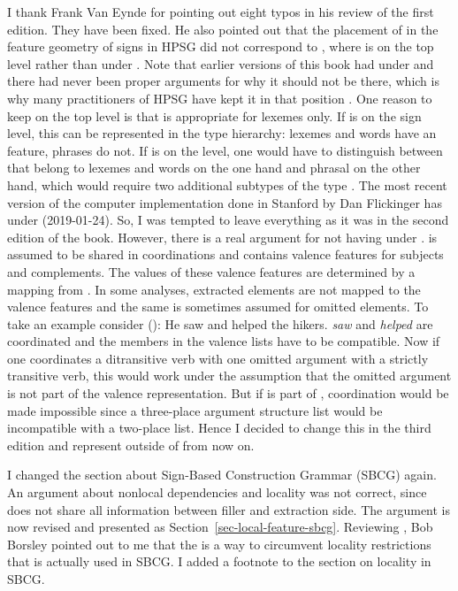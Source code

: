 I thank Frank Van Eynde for pointing out eight typos in his review of the first edition. They have
been fixed. He also pointed out that the placement of \argst in the feature geometry of signs in
HPSG did not correspond to , where \argst is on the top level rather than under
\cat. Note that earlier versions of this book had \argst under \cat and there had never been proper
arguments for why it should not be there, which is why many practitioners of HPSG have kept it in
that position \citep{MuellerLFGphrasal}. One reason to keep \argst on the top level is that \argst is appropriate
for lexemes only. If \argst is on the sign level, this can be represented in the type hierarchy:
lexemes and words have an \argst feature, phrases do not. If \argst is on the \cat level, one would
have to distinguish between \catvs that belong to lexemes and words on the one hand and phrasal
\catvs on the other hand, which would require two additional subtypes of the type . 
The most recent version of the computer implementation done in Stanford by Dan Flickinger has \argst
under \local (2019-01-24). So, I was tempted to leave everything as it was in the second edition of
the book. However, there is a real argument for not having \argst under \cat. \cat is assumed to be
shared in coordinations and \cat contains valence features for subjects and complements. The values of
these valence features are determined by a mapping from \argst. In some analyses, extracted elements
are not mapped to the valence features and the same is sometimes assumed for omitted elements. To
take an example consider ():
\ea
He saw and helped the hikers.
\z
\emph{saw} and \emph{helped} are coordinated and the members in the valence lists have to be
compatible. Now if one coordinates a ditransitive verb with one omitted argument with a strictly
transitive verb, this would work under the assumption that the omitted argument is not part of the
valence representation. But if \argst is part of \cat, coordination would be made impossible since a
three-place argument structure list would be incompatible with a two-place list. Hence I decided to
change this in the third edition and represent \argst outside of \cat from now on.

I changed the section about Sign-Based Construction Grammar (SBCG) again. An argument about nonlocal
dependencies and locality was not correct, since \citet[]{Sag2012a} does not share all
information between filler and extraction side. The argument is now revised and presented as
Section~\ref{sec-local-feature-sbcg}. Reviewing , Bob Borsley pointed out to me that the \xargf is a way to
circumvent locality restrictions that is actually used in SBCG. I added a footnote to the section on
locality in SBCG.

